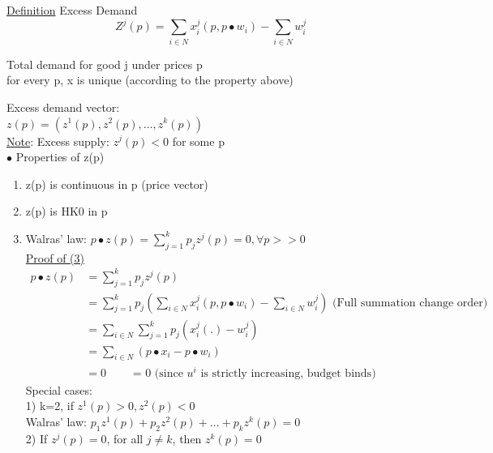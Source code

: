\documentclass[letterpaper,13pt,single,pdftex]{scrartcl}
\begin{document}
\underline{Definition} Excess Demand
\[Z^j(p) = \sum\limits_{i\in N} x_i^j(p,p\bullet w_i) - \sum\limits_{i\in N} w_i^j\]
\begin{center}
    Total demand for good j under prices p\\
    for every p, x is unique (according to the property above)
\end{center}
Excess demand vector: \\
$z(p) = (z^1(p), z^2(p),\dots,z^k(p))$\\
\underline{Note}: Excess supply: $z^j(p) < 0$ for some p \\
$\bullet$ Properties of z(p)
\begin{enumerate}
    \item z(p) is continuous in p (price vector)
    \item z(p) is HK0 in p
    \item Walras' law: $p\bullet z(p)=\sum\limits_{j=1}^{k} p_j z^j(p) = 0, \forall p>>0$\\
    \underline{Proof of (3)}
    \begin{align*}
        p\bullet z(p) &= \sum\limits_{j=1}^{k}p_jz^j(p)\\
        &= \sum\limits_{j=1}^{k}p_j(\sum\limits_{i\in N} x_i ^j(p,p\bullet w_i) - \sum\limits_{i \in N}w_i^j) \text{ (Full summation change order)}\\
        &= \sum\limits_{i \in N} \sum\limits_{j=1}^{k}p_j(x_i^j(.) - w_i^j)\\
        &= \sum\limits_{i \in N}(p\bullet x_i-p\bullet w_i) \\
        &= 0 \qquad \text{ = 0 (since $u^i$ is strictly increasing, budget binds)}
    \end{align*}
    Special cases: \\
        1) k=2, if $z^1(p)>0, z^2(p) < 0$\\
            \hspace*{6mm} Walras' law: $p_1 z^1(p) + p_2z^2(p) +\dots +p_kz^k(p) = 0$\\
        2) If $z^j(p) = 0$, for all $j \ne k$, then $z^k(p) = 0$\\
\end{enumerate}
\end{document}
